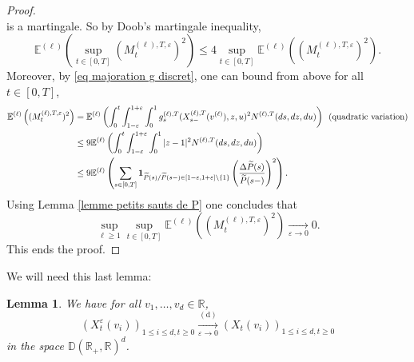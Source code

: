 \documentclass[11pt]{article}
\newtheorem{lemma}[theorem]{Lemma}
\numberwithin{equation}{section}
\def\vp{\varepsilon}
\def \R{\mathbb {R}}
\def\E{\mathbb{E}}
\begin{document}
\begin{proof}
$$$$
is a martingale. So by Doob's martingale inequality,
$$
\E^{(\ell)}
\left(
\sup_{t \in [0,T]}
(M^{(\ell),T,\vp}_t)^2
\right)
\le  4 \sup_{t \in [0,T]} \E^{(\ell)} \left( (M^{(\ell),T,\vp}_t)^2\right).
$$
Moreover, by \eqref{eq majoration g discret}, one can {bound from above} for all $t \in [0,T]$,
\begin{align*}
\E^{(\ell)} \left( (M^{(\ell),T,\vp}_t)^2 \right)
&=\E^{(\ell)} \left(\int_{0}^t \int_{1-\vp}^{1+\vp} \int_0^1
g^{(\ell),T}_s(X^{(\ell),T}_{s-}(v^{(\ell)}),z,u)^2 
{N}^{(\ell),T}(ds,dz,du)
\right) \enskip\text{(quadratic variation)}\\
&\le 9\E^{(\ell)} \left(\int_{0}^t \int_{1-\vp}^{1+\vp} \int_0^1
\vert z-1\vert^2 
{N}^{(\ell),T}(ds,dz,du)
\right) \\
&\le 9 \E^{(\ell)}
\left(
\sum_{s \in[0,T] } {\bf 1}_{ \widetilde{P}(s)/\widetilde{P}(s-) \in [1-\vp,1+\vp]\setminus \{1\} }
\left(\frac{\Delta \widetilde{P}(s)}{\widetilde{P}(s-)}\right)^2 
\right).
\end{align*}
Using Lemma \ref{lemme petits sauts de P} one concludes that
\begin{equation}\label{eq majoration unif de la martingale}
	\sup_{\ell \ge 1} \sup_{t \in [0,T]} \E^{(\ell)} \left( (M^{(\ell),T,\vp}_t)^2\right)
	\mathop{\longrightarrow}\limits_{\vp \to 0} 0.
\end{equation}
This ends the proof.
\end{proof}
 We will need this last lemma:
 \begin{lemma}\label{lemme detronque}
 	We have for all $v_1, \ldots, v_d \in \R$, 
 	$$
 	\left(X_t^{\vp}(v_i)\right)_{ 1 \le i \le d, t\ge 0} \mathop{\longrightarrow}\limits_{\vp \to 0}^{(\mathrm{d})}
 	\left(X_t (v_i)\right)_{1 \le i \le d, t \ge 0}
 	$$ in the space $\mathbb{D}(\R_+, \R)^d$.
 \end{lemma}
\end{document}
